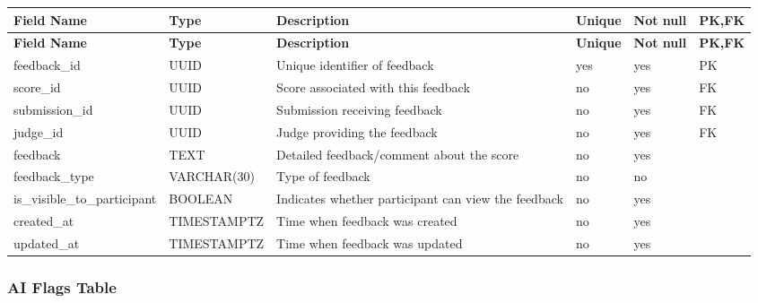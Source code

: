 \vspace{0.5em}
\renewcommand{\arraystretch}{1.15}
\setlength{\tabcolsep}{4pt}
\small
\begin{longtable}{|>{\raggedright\arraybackslash}p{}|>{\raggedright\arraybackslash}p{}|>{\raggedright\arraybackslash}p{}|>{\centering\arraybackslash}p{}|>{\centering\arraybackslash}p{}|>{\centering\arraybackslash}p{}|}
\hline
\textbf{Field Name} & \textbf{Type} & \textbf{Description} & \textbf{Unique} & \textbf{Not null} & \textbf{PK,FK} \\
\hline
\endfirsthead
\textbf{Field Name} & \textbf{Type} & \textbf{Description} & \textbf{Unique} & \textbf{Not null} & \textbf{PK,FK} \\
\hline
\endhead
feedback\_id & UUID & Unique identifier of feedback & yes & yes & PK \\
\hline
score\_id & UUID & Score associated with this feedback & no & yes & FK \\
\hline
submission\_id & UUID & Submission receiving feedback & no & yes & FK \\
\hline
judge\_id & UUID & Judge providing the feedback & no & yes & FK \\
\hline
feedback & TEXT & Detailed feedback/comment about the score & no & yes & \\
\hline
feedback\_type & VARCHAR(30) & Type of feedback & no & no & \\
\hline
is\_visible\_to\_participant & BOOLEAN & Indicates whether participant can view the feedback & no & yes & \\
\hline
created\_at & TIMESTAMPTZ & Time when feedback was created & no & yes & \\
\hline
\newpage
updated\_at & TIMESTAMPTZ & Time when feedback was updated & no & yes & \\
\hline
\end{longtable}

\vspace{1em}
\subsubsection{AI Flags Table}
\label{subsubsec:ai-flags-table}

